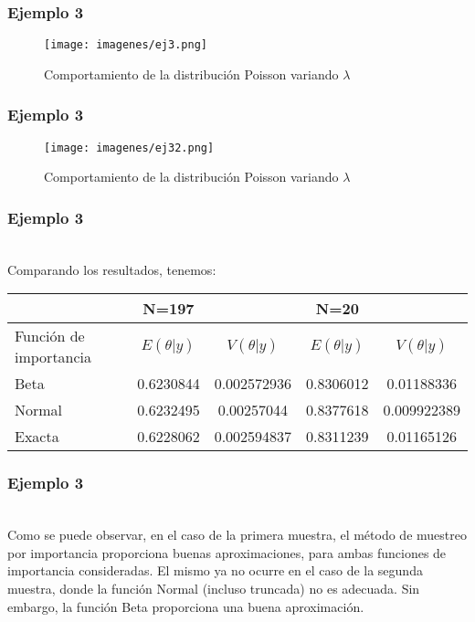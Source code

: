 \documentclass[12pt]{beamer}
\begin{document}
\begin{frame}
\frametitle{Ejemplo 3}
\begin{figure}[!h]
    \begin{center}
        \texttt{[image: imagenes/ej3.png]}
        \caption{Comportamiento de la distribución Poisson variando $\lambda$}
        \label{fig:Densidad}
    \end{center}
\end{figure}
\end{frame}

\begin{frame}
\frametitle{Ejemplo 3}
\begin{figure}[!h]
    \begin{center}
        \texttt{[image: imagenes/ej32.png]}
        \caption{Comportamiento de la distribución Poisson variando $\lambda$}
        \label{fig:Densidad}
    \end{center}
\end{figure}
\end{frame}

\begin{frame}
\frametitle{Ejemplo 3}
~\\Comparando los resultados, tenemos:
\begin{center}
\begin{tabular}{|p{2.2cm}|cc|cc|}
\hline 
 & N=197 &  & N=20 &  \\ 
\hline 
Función de importancia & $E(\theta|y)$ & $V(\theta|y)$ & $E(\theta|y)$ & $V(\theta|y)$ \\ 
\hline 
Beta &  0.6230844 & 0.002572936 & 0.8306012 & 0.01188336 \\ 
\hline 
Normal & 0.6232495 & 0.00257044 & 0.8377618 & 0.009922389 \\ 
\hline 
Exacta & 0.6228062 & 0.002594837 & 0.8311239 & 0.01165126 \\ 
\hline 
\end{tabular} 
\end{center}
\end{frame}


\begin{frame}
\frametitle{Ejemplo 3}
~\\Como se puede observar, en el caso de la primera muestra, el método de muestreo por importancia proporciona buenas aproximaciones, para ambas funciones de importancia consideradas.  El mismo ya no ocurre en el caso de la segunda muestra, donde la función Normal (incluso truncada) no es adecuada. Sin embargo, la función Beta proporciona una buena aproximación. 
\end{frame}
\end{document}
